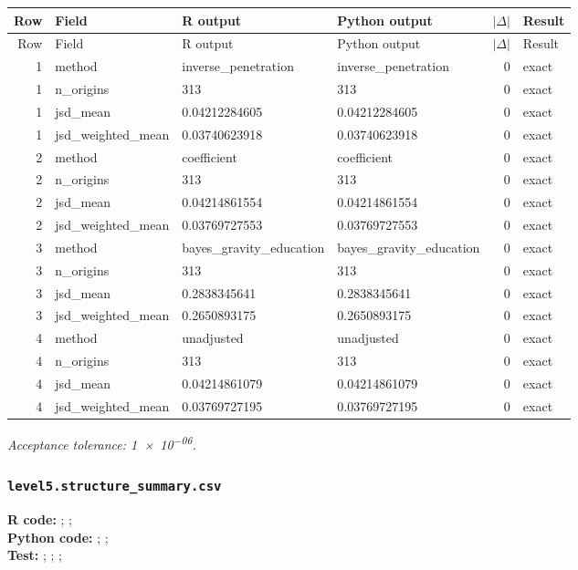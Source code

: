 \documentclass[10pt]{article}
\begin{document}
\small
\begin{longtable}{@{}r p{}p{}p{}rl@{}}
\toprule
Row & Field & R output & Python output & $|\Delta|$ & Result \\
\midrule
\endfirsthead
\toprule
Row & Field & R output & Python output & $|\Delta|$ & Result \\
\midrule
\endhead
1 & method & inverse\_\allowbreak{}penetration & inverse\_\allowbreak{}penetration & 0 & exact \\
1 & n\_\allowbreak{}origins & 313 & 313 & 0 & exact \\
1 & jsd\_\allowbreak{}mean & 0.04212284605 & 0.04212284605 & 0 & exact \\
1 & jsd\_\allowbreak{}weighted\_\allowbreak{}mean & 0.03740623918 & 0.03740623918 & 0 & exact \\
2 & method & coefficient & coefficient & 0 & exact \\
2 & n\_\allowbreak{}origins & 313 & 313 & 0 & exact \\
2 & jsd\_\allowbreak{}mean & 0.04214861554 & 0.04214861554 & 0 & exact \\
2 & jsd\_\allowbreak{}weighted\_\allowbreak{}mean & 0.03769727553 & 0.03769727553 & 0 & exact \\
3 & method & bayes\_\allowbreak{}gravity\_\allowbreak{}education & bayes\_\allowbreak{}gravity\_\allowbreak{}education & 0 & exact \\
3 & n\_\allowbreak{}origins & 313 & 313 & 0 & exact \\
3 & jsd\_\allowbreak{}mean & 0.2838345641 & 0.2838345641 & 0 & exact \\
3 & jsd\_\allowbreak{}weighted\_\allowbreak{}mean & 0.2650893175 & 0.2650893175 & 0 & exact \\
4 & method & unadjusted & unadjusted & 0 & exact \\
4 & n\_\allowbreak{}origins & 313 & 313 & 0 & exact \\
4 & jsd\_\allowbreak{}mean & 0.04214861079 & 0.04214861079 & 0 & exact \\
4 & jsd\_\allowbreak{}weighted\_\allowbreak{}mean & 0.03769727195 & 0.03769727195 & 0 & exact \\
\bottomrule
\end{longtable}
\normalsize
\textit{Acceptance tolerance: \num{1e-06}.}

\subsubsection{\texorpdfstring{\texttt{level5.structure\_summary.csv}}{level5.structure\_summary.csv}}
{\footnotesize \textbf{R code:} ; ; \\ \textbf{Python code:} ; ; \\ \textbf{Test:} ; ; ; \par}
\end{document}
